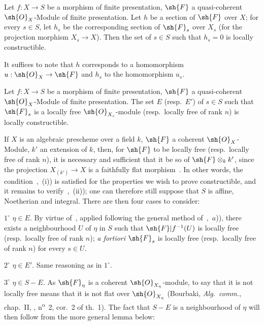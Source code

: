 
\begin{corollary}[9.4.6]
\label{IV.9.4.6}
Let $f:X\to S$ be a morphism of finite presentation, $\sh{F}$ a quasi-coherent $\sh{O}_X$-Module of finite presentation.
Let $h$ be a section of $\sh{F}$ over $X$; for every $s\in S$, let $h_s$ be the corresponding section of $\sh{F}_s$ over $X_s$ \textnormal{(}for the projection morphism $X_s\to X$\textnormal{)}.
Then the set of $s\in S$ such that $h_s=0$ is locally constructible.
\end{corollary}

It suffices to note that $h$ corresponds to a homomorphism $u:\sh{O}_X\to\sh{F}$ and $h_s$ to the homomorphism $u_s$.

\begin{proposition}[9.4.7]
\label{IV.9.4.7}
Let $f:X\to S$ be a morphism of finite presentation, $\sh{F}$ a quasi-coherent $\sh{O}_X$-Module of finite presentation.
The set $E$ \textnormal{(}resp.\ $E'$\textnormal{)} of $s\in S$ such that $\sh{F}_s$ is a locally free $\sh{O}_{X_s}$-module \textnormal{(}resp.\ locally free of rank $n$\textnormal{)} is locally constructible.
\end{proposition}

If $X$ is an algebraic prescheme over a field $k$, $\sh{F}$ a coherent $\sh{O}_X$-Module, $k'$ an extension of $k$, then, for $\sh{F}$ to be locally free (resp.\ locally free of rank $n$), it is necessary and sufficient that it be so of $\sh{F}\otimes_k k'$, since the projection $X_{(k')}\to X$ is a faithfully flat morphism~.
In other words, the condition~,~(i)) is satisfied for the properties we wish to prove constructible, and it remains to verify~,~(ii)); one can therefore still suppose that $S$ is affine, Noetherian and integral.
There are then four cases to consider:

$1^\circ$ $\eta\in E$.
By virtue of~, applied following the general method of~,~$a$)), there exists a neighbourhood $U$ of $\eta$ in $S$ such that $\sh{F}|f^{-1}(U)$ is locally free (resp.\ locally free of rank $n$); \emph{a fortiori} $\sh{F}_s$ is locally free (resp.\ locally free of rank $n$) for every $s\in U$.

$2^\circ$ $\eta\in E'$.
Same reasoning as in $1^\circ$.

$3^\circ$ $\eta\in S-E$.
As $\sh{F}_\eta$ is a coherent $\sh{O}_{X_\eta}$-module, to say that it is not locally free means that it is not flat over $\sh{O}_{X_\eta}$ (Bourbaki, \emph{Alg.\ comm.}, chap.~II, , n\textsuperscript{o}~2, cor.~2 of th.~1).
The fact that $S-E$ is a neighbourhood of $\eta$ will then follow from the more general lemma below:


